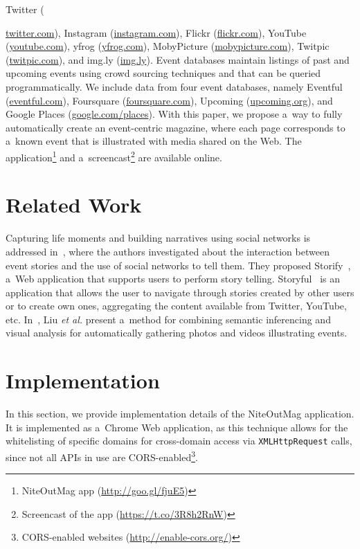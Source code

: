 \documentclass[runningheads,a4paper]{llncs}
\begin{document}
Twitter ({\url{twitter.com}),
Instagram (\url{instagram.com}),
Flickr (\url{flickr.com}),
YouTube (\url{youtube.com}),
yfrog (\url{yfrog.com}),
MobyPicture (\url{mobypicture.com}),
Twitpic (\url{twitpic.com}), and
\mbox{img.ly} (\url{img.ly}).
Event databases maintain listings of past and upcoming events using crowd sourcing techniques and that can be queried programmatically. We include data from four event databases, namely Eventful (\url{eventful.com}), Foursquare (\url{foursquare.com}), Upcoming (\url{upcoming.org}), and Google Places (\url{google.com/places}).
With this paper, we propose a~way to fully automatically create an event-centric magazine, where each page corresponds to a~known event that is illustrated with media shared on the Web. The application\footnote{NiteOutMag app (\url{http://goo.gl/fjuE5})} and a~screencast\footnote{Screencast of the app (\url{https://t.co/3R8h2RnW})} are available online. 


\section{Related Work}                                                      \label{sec:related-work}
Capturing life moments and building narratives using social networks is addressed in~\cite{Atosy2011}, where the authors investigated about the interaction between event stories and the use of social networks to tell them. They proposed Storify~\cite{Storify2012}, a~Web application that supports users to perform story telling. Storyful~\cite{Storyful2012} is an application  that allows the user to navigate through stories created by other users or to create own ones, aggregating the content available from Twitter, YouTube, etc.
In~\cite{Liu2011}, Liu \emph{et al.} present a~method for combining semantic inferencing and visual analysis for automatically gathering photos and videos illustrating events.


\section{Implementation}                                                    \label{sec:implementation}
In this section, we provide implementation details of the NiteOutMag application. It is implemented as a~Chrome Web application, as this technique allows for the whitelisting of specific domains for cross-domain access via \texttt{XMLHttpRequest} calls, since not all APIs in use are CORS-enabled\footnote{CORS-enabled websites (\url{http://enable-cors.org/})}.

}
\end{document}
